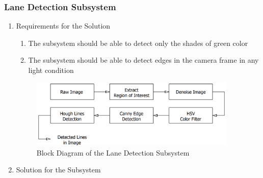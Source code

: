 \documentclass[a4paper,12pt]{article}
\begin{document}
	
		\subsubsection{Lane Detection Subsystem}\label{sec:LaneDetectionSubsystem}

			\begin{enumerate}
			\item {Requirements for the Solution}

				
		
		
			
			\begin{enumerate}
				\item The subsystem should be able to detect only the shades of green color
				\item The subsystem should be able to detect edges in the camera frame in any light condition

			\end{enumerate}
			
		
			
			\begin{figure}[h]
			\includegraphics[width=0.93\textwidth,center]{images/vModels/laneDetection_subsystem}
			\caption{Block Diagram of the Lane Detection Subsystem}\label{fig:lane_detection_subsystem}
		\end{figure}
		
			
			
			\item {Solution for the Subsystem}
			

\end{enumerate}
\end{document}

